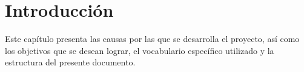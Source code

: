 

\chapter{Introducción}
\thispagestyle{chapterpage}

Este capítulo presenta las causas por las que se desarrolla el proyecto,
así como los objetivos que se desean lograr, el vocabulario específico 
utilizado y la estructura del presente documento.







